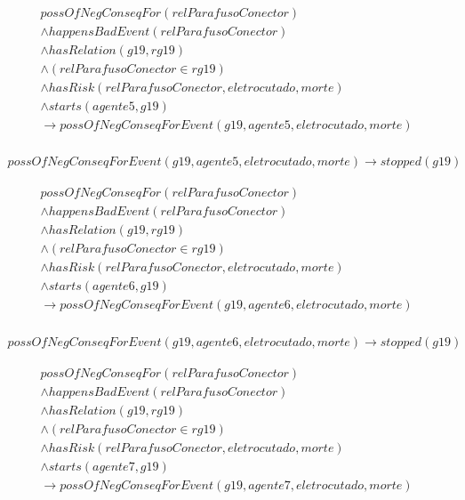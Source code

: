 \begin{eqnarray}\nonumber
    possOfNegConseqFor(relParafusoConector) \nonumber \\
    \wedge happensBadEvent(relParafusoConector) \nonumber \\ 
    \wedge hasRelation(g19,rg19)  \nonumber \\  
    \wedge (relParafusoConector \in rg19) \nonumber \\ 
    \wedge hasRisk(relParafusoConector,eletrocutado,morte) \nonumber \\  
    \wedge starts(agente5,g19) \nonumber \\ 
    \to possOfNegConseqForEvent(g19,agente5,eletrocutado,morte) \\ \nonumber
\end{eqnarray}

\begin{eqnarray}
	possOfNegConseqForEvent(g19,agente5,eletrocutado,morte) \to stopped(g19)
\end{eqnarray}

\begin{eqnarray}\nonumber
   possOfNegConseqFor(relParafusoConector) \nonumber \\
    \wedge happensBadEvent(relParafusoConector) \nonumber \\ 
    \wedge hasRelation(g19,rg19)  \nonumber \\  
    \wedge (relParafusoConector \in rg19) \nonumber \\ 
    \wedge hasRisk(relParafusoConector,eletrocutado,morte) \nonumber \\  
    \wedge starts(agente6,g19) \nonumber \\ 
    \to possOfNegConseqForEvent(g19,agente6,eletrocutado,morte) \\ \nonumber
\end{eqnarray}

\begin{eqnarray}
	possOfNegConseqForEvent(g19,agente6,eletrocutado,morte) \to stopped(g19)
\end{eqnarray}

\begin{eqnarray}\nonumber
   possOfNegConseqFor(relParafusoConector) \nonumber \\
    \wedge happensBadEvent(relParafusoConector) \nonumber \\ 
    \wedge hasRelation(g19,rg19)  \nonumber \\  
    \wedge (relParafusoConector \in rg19) \nonumber \\ 
    \wedge hasRisk(relParafusoConector,eletrocutado,morte) \nonumber \\  
    \wedge starts(agente7,g19) \nonumber \\ 
    \to possOfNegConseqForEvent(g19,agente7,eletrocutado,morte) \\ \nonumber
\end{eqnarray}

